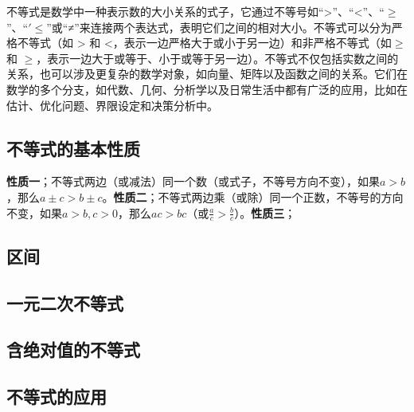 \documentclass[a5paper]{article}
\begin{document}
不等式是数学中一种表示数的大小关系的式子，它通过不等号如“>”、“<”、“$\ge$”、“$'\le$”或“≠”来连接两个表达式，表明它们之间的相对大小。不等式可以分为严格不等式（如 > 和 <，表示一边严格大于或小于另一边）和非严格不等式（如$\ge$ 和 $\ge$，表示一边大于或等于、小于或等于另一边）。不等式不仅包括实数之间的关系，也可以涉及更复杂的数学对象，如向量、矩阵以及函数之间的关系。它们在数学的多个分支，如代数、几何、分析学以及日常生活中都有广泛的应用，比如在估计、优化问题、界限设定和决策分析中。

\subsection{不等式的基本性质}

\textbf{性质一}；不等式两边（或减法）同一个数（或式子，不等号方向不变），如果$a>b$，那么$a\pm c>b\pm c$。\textbf{性质二}；不等式两边乘（或除）同一个正数，不等号的方向不变，如果$a>b,c>0$，那么$ac>bc$（或$\frac{a}{c}>\frac{b}{c}$）。\textbf{性质三}；

\subsection{区间}

\subsection{一元二次不等式}

\subsection{含绝对值的不等式}

\subsection{不等式的应用}
\end{document}
